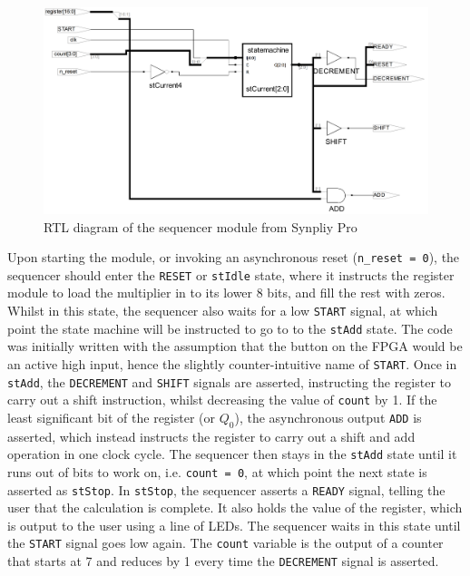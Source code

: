 \documentclass[a4paper,11pt]{article}
\begin{document}
\begin{figure}
    \centering
        \includegraphics[scale=0.17]{./RTL/sequencer_c.png}
    \caption{RTL diagram of the sequencer module from Synpliy Pro}
    \label{fig:seqRTL}
\end{figure}

Upon starting the module, or invoking an asynchronous reset (\lstinline{n_reset = 0}), the sequencer should enter the \lstinline{RESET} or \lstinline{stIdle} state, where it instructs the register module to load the multiplier in to its lower 8 bits, and fill the rest with zeros. Whilst in this state, the sequencer also waits for a low \lstinline{START} signal, at which point the state machine will be instructed to go to to the \lstinline{stAdd} state. The code was initially written with the assumption that the button on the FPGA would be an active high input, hence the slightly counter-intuitive name of \lstinline{START}. Once in \lstinline{stAdd}, the \lstinline{DECREMENT} and \lstinline{SHIFT} signals are asserted, instructing the register to carry out a shift instruction, whilst decreasing the value of \lstinline{count} by 1. If the least significant bit of the register (or $Q_0$), the asynchronous output \lstinline{ADD} is asserted, which instead instructs the register to carry out a shift and add operation in one clock cycle. The sequencer then stays in the \lstinline{stAdd} state until it runs out of bits to work on, i.e. \lstinline{count = 0}, at which point the next state is asserted as \lstinline{stStop}. In \lstinline{stStop}, the sequencer asserts a \lstinline{READY} signal, telling the user that the calculation is complete. It also holds the value of the register, which is output to the user using a line of LEDs. The sequencer waits in this state until the \lstinline{START} signal goes low again. The \lstinline{count} variable is the output of a counter that starts at 7 and reduces by 1 every time the \lstinline{DECREMENT} signal is asserted.
\end{document}
